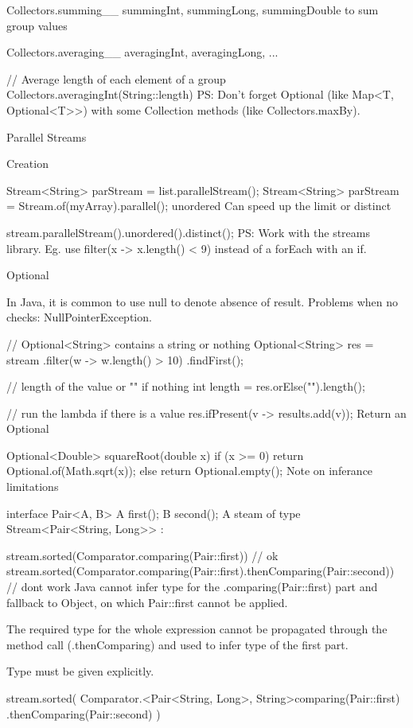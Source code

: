 Collectors.summing\_\_ summingInt, summingLong, summingDouble to sum group values

Collectors.averaging\_\_ averagingInt, averagingLong, ...

// Average length of each element of a group
Collectors.averagingInt(String::length)
PS: Don't forget Optional (like Map<T, Optional<T>>) with some Collection methods (like Collectors.maxBy).

Parallel Streams

Creation

Stream<String> parStream = list.parallelStream();
Stream<String> parStream = Stream.of(myArray).parallel();
unordered Can speed up the limit or distinct

stream.parallelStream().unordered().distinct();
PS: Work with the streams library. Eg. use filter(x -> x.length() < 9) instead of a forEach with an if.

Optional

In Java, it is common to use null to denote absence of result. Problems when no checks: NullPointerException.

// Optional<String> contains a string or nothing
Optional<String> res = stream
   .filter(w -> w.length() > 10)
   .findFirst();

// length of the value or "" if nothing
int length = res.orElse("").length();

// run the lambda if there is a value
res.ifPresent(v -> results.add(v));
Return an Optional

Optional<Double> squareRoot(double x) {
   if (x >= 0) { return Optional.of(Math.sqrt(x)); }
   else { return Optional.empty(); }
}
Note on inferance limitations

interface Pair<A, B> {
    A first();
    B second();
}
A steam of type Stream<Pair<String, Long>> :

stream.sorted(Comparator.comparing(Pair::first)) // ok
stream.sorted(Comparator.comparing(Pair::first).thenComparing(Pair::second)) // dont work
Java cannot infer type for the .comparing(Pair::first) part and fallback to Object, on which Pair::first cannot be applied.

The required type for the whole expression cannot be propagated through the method call (.thenComparing) and used to infer type of the first part.

Type must be given explicitly.

stream.sorted(
    Comparator.<Pair<String, Long>, String>comparing(Pair::first)
    .thenComparing(Pair::second)
)

